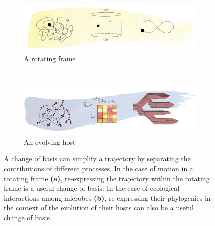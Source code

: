 \begin{figure}
    \centering
    \begin{subfigure}[b]{\textwidth}
        \includegraphics[width=\textwidth]{FishPoo/figures/change_of_basis_a}
        \small
        \caption{A rotating frame}
    \end{subfigure}\\
    \begin{subfigure}[b]{\textwidth}
        \includegraphics[width=\textwidth]{FishPoo/figures/change_of_basis_b}
        \small
        \caption{An evolving host}
    \end{subfigure}
    \caption{A change of basis can simplify a trajectory by separating the contributions of different processes. In the case of motion in a rotating frame \textbf{(a)}, re-expressing the trajectory within the rotating frame is a useful change of basis. In the case of ecological interactions among microbes \textbf{(b)}, re-expressing their phylogenies in the context of the evolution of their hosts can also be a useful change of basis. }
    \label{fig:FP_change_of_basis}
\end{figure}
